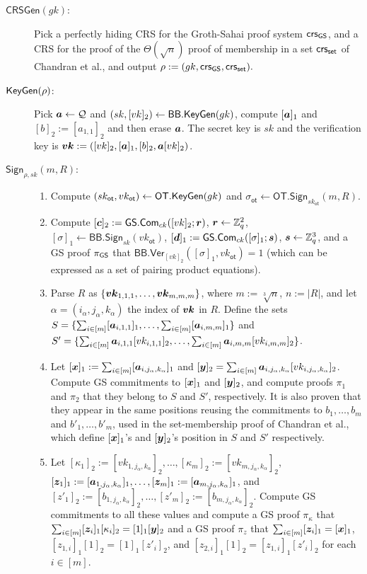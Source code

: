 \begin{description}
\item[$\mathsf{CRSGen}(gk)$:] Pick a perfectly hiding CRS for the Groth-Sahai proof system $\mathsf{crs}_{\mathsf{GS}}$, and a CRS for the proof of the $\Theta(\sqrt{n})$ proof of membership in a set $\mathsf{crs}_{\mathsf{set}}$ of Chandran et al., and output $\rho:=(gk,\mathsf{crs}_{\mathsf{GS}},\mathsf{crs}_{\mathsf{set}}).$
\item[$\mathsf{KeyGen}(\rho)$:] Pick ${\boldsymbol{a}}\gets\mathcal{Q}$ and $(sk,[vk]_2)\gets\mathsf{BB}.\mathsf{KeyGen}(gk)$, compute $[{\boldsymbol{a}}]_1$ and $[b]_2 := [a_{1,1}]_2$ and then erase ${\boldsymbol{a}}$. The secret key is $sk$ and the verification key is ${\boldsymbol{vk}}:=([vk]_2,[{\boldsymbol{a}}]_1,[b]_2,{\boldsymbol{a}}[vk]_2)$.
\item[$\mathsf{Sign}_{\rho,sk}(m,R)$:]
\begin{enumerate}
\item Compute $(sk_\mathsf{ot},vk_\mathsf{ot})\gets\mathsf{OT}.\mathsf{KeyGen}(gk)$ and $\sigma_\mathsf{ot}\gets\allowbreak\mathsf{OT}.\allowbreak\mathsf{Sign}_{sk_\mathsf{ot}}(m,R)$.
\item Compute $[{\boldsymbol{c}}]_2:={\mathsf{GS}}.\mathsf{Com}_{ck}([vk]_2;{\boldsymbol{r}})$, ${\boldsymbol{r}}\gets\mathbb{Z}_q^2$, $[\sigma]_1\gets\mathsf{BB}.\mathsf{Sign}_{sk}(vk_\mathsf{ot})$, $[{\boldsymbol{d}}]_1:={\mathsf{GS}}.\mathsf{Com}_{ck}([\sigma]_1;{\boldsymbol{s}})$, ${\boldsymbol{s}}\gets\mathbb{Z}_q^3$, and a GS proof $\pi_{\mathsf{GS}}$ that $\mathsf{BB}.\mathsf{Ver}_{[vk]_2}(\allowbreak[\sigma]_1,vk_\mathsf{ot})=1$ (which can be expressed as a set of pairing product equations).
\item Parse $R$ as $\{{\boldsymbol{vk}}_{1,1,1},\ldots,{\boldsymbol{vk}}_{m,m,m}\}$, where $m:=\sqrt[3]{n}$, $n:=|R|$, and let $\alpha=(i_\alpha,j_\alpha,k_\alpha)$ the index of ${\boldsymbol{vk}}$ in $R$. Define the sets $S=\{\sum_{i\in[m]}[{\boldsymbol{a}}_{i,1,1}]_1,\allowbreak\ldots,\sum_{i\in[m]}[{\boldsymbol{a}}_{i,m,m}]_1\}$ and\\ $S'=\{\sum_{i\in[m]}{\boldsymbol{a}}_{i,1,1}[vk_{i,1,1}]_2,\allowbreak\ldots,\sum_{i\in[m]}{\boldsymbol{a}}_{i,m,m}[vk_{i,m,m}]_2\}$.
\item Let $[{\boldsymbol{x}}]_1:=\sum_{i\in[m]}[{\boldsymbol{a}}_{i,j_\alpha,k_\alpha}]_1$ and $[{\boldsymbol{y}}]_2=\sum_{i\in[m]}{\boldsymbol{a}}_{i,j_\alpha,k_\alpha}[vk_{i,j_\alpha,k_\alpha}]_2$. Compute GS commitments to $[{\boldsymbol{x}}]_1$ and $[{\boldsymbol{y}}]_2$, and compute proofs $\pi_1$ and $\pi_2$ that they belong to $S$ and $S'$, respectively. It is also proven that they appear in the same positions reusing the commitments to $b_1,\ldots,b_{m}$ and $b'_1,\ldots,b'_{m}$, used in the set-membership proof of Chandran et al., which define $[{\boldsymbol{x}}]_1$'s and $[{\boldsymbol{y}}]_2$'s position in $S$ and $S'$ respectively.
\item Let $[\kappa_1]_2:=[vk_{1,j_\alpha,k_\alpha}]_2,\ldots,[\kappa_m]_2:=[vk_{m,j_\alpha,k_\alpha}]_2$, $[{\boldsymbol{z}}_1]_1:=\allowbreak[{\boldsymbol{a}}_{1,j_\alpha,k_\alpha}]_1,\allowbreak\ldots,[{\boldsymbol{z}}_m]_1:=[{\boldsymbol{a}}_{m,j_\alpha,k_\alpha}]_1$, and $[z'_1]_2:=[b_{1,j_\alpha,k_\alpha}]_2,\ldots,[z'_m]_2:=[b_{m,j_\alpha,k_\alpha}]_2$. Compute GS commitments to all these values and compute a GS proof $\pi_\kappa$ that $\sum_{i\in[m]}[{\boldsymbol{z}}_i]_1[\kappa_i]_2=[1]_1[{\boldsymbol{y}}]_2$ and a GS proof $\pi_{z}$ that $\sum_{i\in[m]}[{\boldsymbol{z}}_i]_1=[{\boldsymbol{x}}]_1$,  $[z_{1,i}]_1[1]_2 = [1]_1[z'_i]_2$, and $[z_{2,i}]_1[1]_2=[z_{1,i}]_1[z'_{i}]_2$ for each $i\in[m]$.

\end{enumerate}
\end{description}
